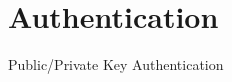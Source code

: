 \documentclass{beamer}
\begin{document}
	\section{Authentication}

	\begin{frame}{Public/Private Key Authentication} %

	\end{frame}


	\begin{frame}[plain]\end{frame}
\end{document}
